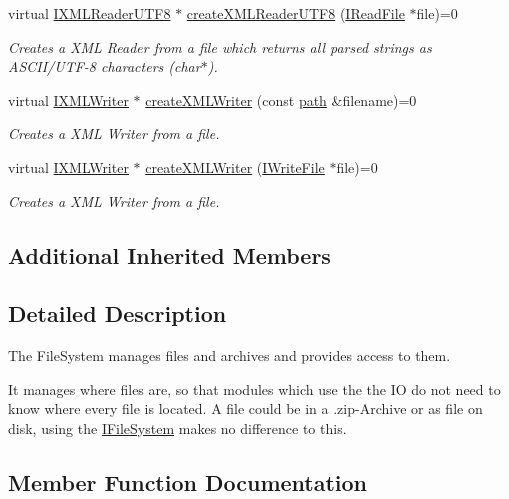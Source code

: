 \begin{DoxyCompactItemize}
virtual \hyperlink{namespaceirr_1_1io_a2dedc8156931082e6b147b562195e310}{I\+X\+M\+L\+Reader\+U\+T\+F8} $\ast$ \hyperlink{classirr_1_1io_1_1IFileSystem_acda42a761d3b2fb4d39ad1d9e2ada973}{create\+X\+M\+L\+Reader\+U\+T\+F8} (\hyperlink{classirr_1_1io_1_1IReadFile}{I\+Read\+File} $\ast$file)=0
\begin{DoxyCompactList}\small\item\em Creates a X\+ML Reader from a file which returns all parsed strings as A\+S\+C\+I\+I/\+U\+T\+F-\/8 characters (char$\ast$). \end{DoxyCompactList}\item 
virtual \hyperlink{classirr_1_1io_1_1IXMLWriter}{I\+X\+M\+L\+Writer} $\ast$ \hyperlink{classirr_1_1io_1_1IFileSystem_a0737712d1c90001e5765ef46912c616d}{create\+X\+M\+L\+Writer} (const \hyperlink{namespaceirr_1_1io_ab1bdc45edb3f94d8319c02bc0f840ee1}{path} \&filename)=0
\begin{DoxyCompactList}\small\item\em Creates a X\+ML Writer from a file. \end{DoxyCompactList}\item 
virtual \hyperlink{classirr_1_1io_1_1IXMLWriter}{I\+X\+M\+L\+Writer} $\ast$ \hyperlink{classirr_1_1io_1_1IFileSystem_ac2bcaf8c338e80ff579061b7056c06da}{create\+X\+M\+L\+Writer} (\hyperlink{classirr_1_1io_1_1IWriteFile}{I\+Write\+File} $\ast$file)=0
\begin{DoxyCompactList}\small\item\em Creates a X\+ML Writer from a file. \end{DoxyCompactList}\end{DoxyCompactItemize}
\subsection*{Additional Inherited Members}


\subsection{Detailed Description}
The File\+System manages files and archives and provides access to them. 

It manages where files are, so that modules which use the the IO do not need to know where every file is located. A file could be in a .zip-\/\+Archive or as file on disk, using the \hyperlink{classirr_1_1io_1_1IFileSystem}{I\+File\+System} makes no difference to this. 

\subsection{Member Function Documentation}
